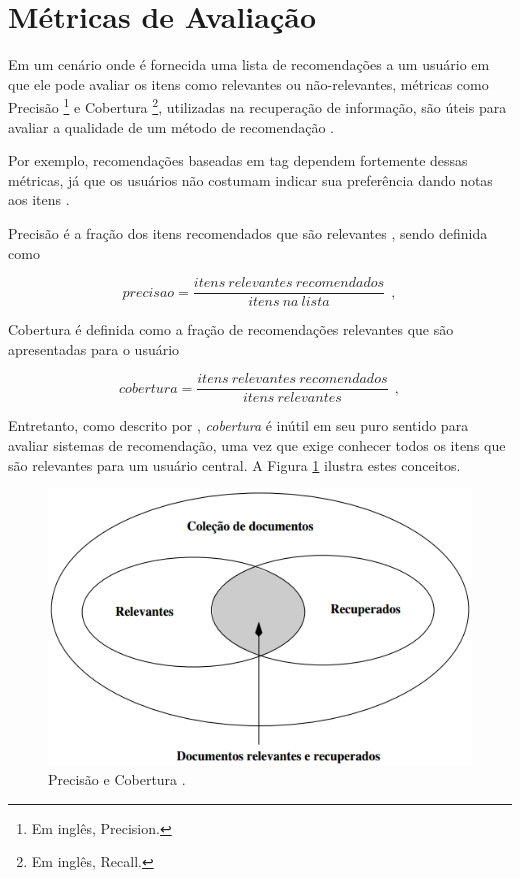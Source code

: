 \section{Métricas de Avaliação}

Em um cenário onde é fornecida uma lista de recomendações a um usuário em que ele pode avaliar os itens como relevantes ou não-relevantes, métricas como Precisão \footnote{Em inglês, Precision.} e Cobertura \footnote{Em inglês, Recall.}, utilizadas na recuperação de informação, são úteis para avaliar a qualidade de um método de recomendação \citep{parra2013}.

Por exemplo, recomendações baseadas em tag dependem fortemente dessas métricas, já que os usuários não costumam indicar sua preferência dando notas aos itens \citep{Bogers:2009}.

Precisão é a fração dos itens recomendados que são relevantes \citep{Manning:2008:IIR:1394399}, sendo definida como

\begin{equation}
precisao = \frac{itens~relevantes~recomendados}{itens~na~lista}~~,
\end{equation}

Cobertura é definida como a fração de recomendações relevantes que são apresentadas para o usuário \citep{Manning:2008:IIR:1394399}

\begin{equation}
cobertura = \frac{itens~relevantes~recomendados}{itens~relevantes}~~,
\end{equation}

Entretanto, como descrito por \cite{Herlocker:2004:ECF:963770.963772}, \textit{cobertura} é inútil em seu puro sentido para avaliar sistemas de recomendação, uma vez que exige conhecer todos os itens que são relevantes para um usuário central. A Figura \ref{fig:precisaocobertura} ilustra estes conceitos.

\begin{figure}
	\centering
	\includegraphics[scale=0.8]{imagens/precisao_cobertura.png}
	\caption{Precisão e Cobertura  \citep{DBLP:journals/rita/Barth13}.}
	\label{fig:precisaocobertura}
\end{figure}


